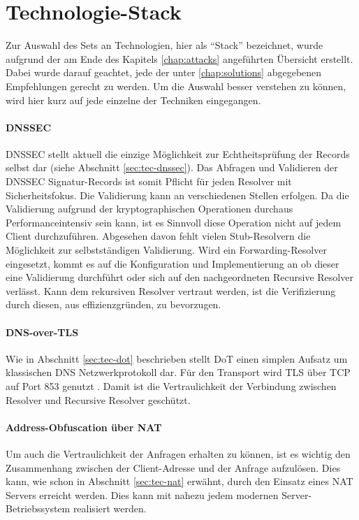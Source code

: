 \section{Technologie-Stack}
Zur Auswahl des Sets an Technologien, hier als ``Stack'' bezeichnet, wurde aufgrund der am Ende des Kapitels \ref{chap:attacks} angeführten Übersicht erstellt. Dabei wurde darauf geachtet, jede der unter \ref{chap:solutions} abgegebenen Empfehlungen gerecht zu werden. Um die Auswahl besser verstehen zu können, wird hier kurz auf jede einzelne der Techniken eingegangen.

\paragraph{DNSSEC}
DNSSEC stellt aktuell die einzige Möglichkeit zur Echtheitsprüfung der Records selbst dar (siehe Abschnitt \ref{sec:tec-dnssec}). Das Abfragen und Validieren der DNSSEC Signatur-Records ist somit Pflicht für jeden Resolver mit Sicherheitsfokus. Die Validierung kann an verschiedenen Stellen erfolgen. Da die Validierung aufgrund der kryptographischen Operationen durchaus Performanceintensiv sein kann, ist es Sinnvoll diese Operation nicht auf jedem Client durchzuführen. Abgesehen davon fehlt vielen Stub-Resolvern die Möglichkeit zur selbstständigen Validierung. Wird ein Forwarding-Resolver eingesetzt, kommt es auf die Konfiguration und Implementierung an ob dieser eine Validierung durchführt oder sich auf den nachgeordneten Recursive Resolver verlässt. Kann dem rekursiven Resolver vertraut werden, ist die Verifizierung durch diesen, aus effizienzgründen, zu bevorzugen.

\paragraph{DNS-over-TLS}
Wie in Abschnitt \ref{sec:tec-dot} beschrieben stellt DoT einen simplen Aufsatz um klassischen DNS Netzwerkprotokoll dar. Für den Transport wird TLS über TCP auf Port 853 genutzt \cite{rfc7858}. Damit ist die Vertraulichkeit der Verbindung zwischen Resolver und Recursive Resolver geschützt. 

\paragraph{Address-Obfuscation über NAT}
Um auch die Vertraulichkeit der Anfragen erhalten zu können, ist es wichtig den Zusammenhang zwischen der Client-Adresse und der Anfrage aufzulösen. Dies kann, wie schon in Abschnitt \ref{sec:tec-nat} erwähnt, durch den Einsatz eines NAT Servers erreicht werden. Dies kann mit nahezu jedem modernen Server-Betriebssystem realisiert werden.

